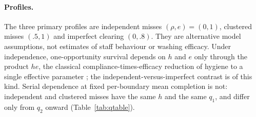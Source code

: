 \paragraph{Profiles.} The three primary profiles are independent misses
$(\rho,e)=(0,1)$, clustered misses $(.5,1)$ and imperfect clearing $(0,.8)$.
They are alternative model assumptions, not estimates of staff behaviour or
washing efficacy. Under independence, one-opportunity survival depends on $h$
and $e$ only through the product $he$, the classical compliance-times-efficacy
reduction of hygiene to a single effective parameter
\citep{austin1999,beggs2009}; the independent-versus-imperfect contrast is of this
kind. Serial dependence at fixed per-boundary mean completion is not: independent and
clustered misses have the same $h$ and the same $q_1$, and differ only from
$q_2$ onward (Table~\ref{tab:qtable}).

